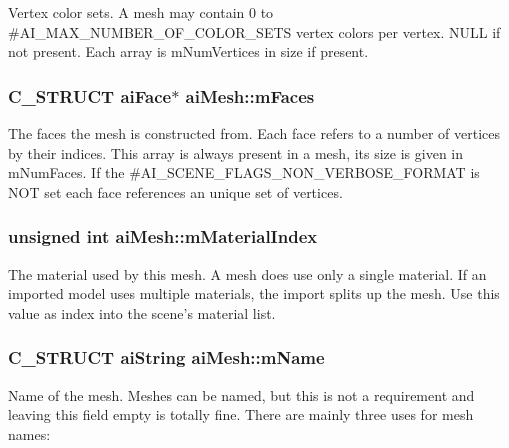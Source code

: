 Vertex color sets. A mesh may contain 0 to \#\-A\-I\-\_\-\-M\-A\-X\-\_\-\-N\-U\-M\-B\-E\-R\-\_\-\-O\-F\-\_\-\-C\-O\-L\-O\-R\-\_\-\-S\-E\-T\-S vertex colors per vertex. N\-U\-L\-L if not present. Each array is m\-Num\-Vertices in size if present. \hypertarget{structai_mesh_a5a65fbc7fdea7f8d36f39047425ece07}{
\subsubsection[{m\-Faces}]{\setlength{\rightskip}{0pt plus 5cm}C\-\_\-\-S\-T\-R\-U\-C\-T {\bf ai\-Face}$\ast$ ai\-Mesh\-::m\-Faces}}\label{structai_mesh_a5a65fbc7fdea7f8d36f39047425ece07}
The faces the mesh is constructed from. Each face refers to a number of vertices by their indices. This array is always present in a mesh, its size is given in m\-Num\-Faces. If the \#\-A\-I\-\_\-\-S\-C\-E\-N\-E\-\_\-\-F\-L\-A\-G\-S\-\_\-\-N\-O\-N\-\_\-\-V\-E\-R\-B\-O\-S\-E\-\_\-\-F\-O\-R\-M\-A\-T is N\-O\-T set each face references an unique set of vertices. \hypertarget{structai_mesh_aa2807c7ba172115203ed16047ad65f9e}{
\subsubsection[{m\-Material\-Index}]{\setlength{\rightskip}{0pt plus 5cm}unsigned int ai\-Mesh\-::m\-Material\-Index}}\label{structai_mesh_aa2807c7ba172115203ed16047ad65f9e}
The material used by this mesh. A mesh does use only a single material. If an imported model uses multiple materials, the import splits up the mesh. Use this value as index into the scene's material list. \hypertarget{structai_mesh_a8dd9433e0c5b008e3e5aee6c801d3b74}{
\subsubsection[{m\-Name}]{\setlength{\rightskip}{0pt plus 5cm}C\-\_\-\-S\-T\-R\-U\-C\-T {\bf ai\-String} ai\-Mesh\-::m\-Name}}\label{structai_mesh_a8dd9433e0c5b008e3e5aee6c801d3b74}
Name of the mesh. Meshes can be named, but this is not a requirement and leaving this field empty is totally fine. There are mainly three uses for mesh names\-:
